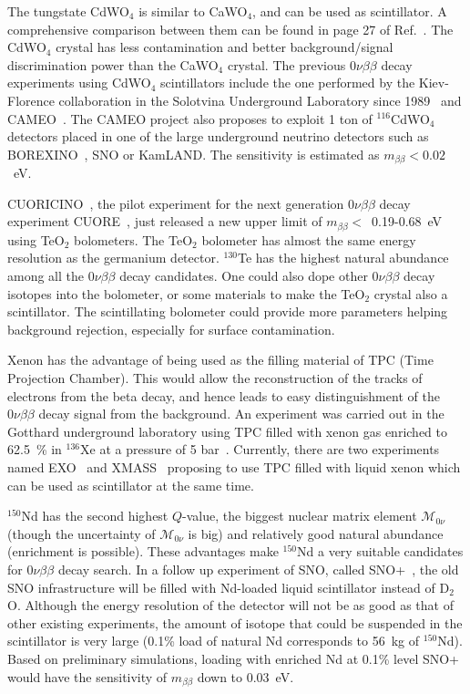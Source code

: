 The tungstate CdWO$_{4}$ is similar to CaWO$_{4}$, and can be used as scintillator. A comprehensive comparison between them can be found in page 27 of Ref.~\cite{Avi05}. The CdWO$_{4}$ crystal has less contamination and better background/signal discrimination power than the CaWO$_{4}$ crystal. The previous $0\nu\beta\beta$ decay experiments using CdWO$_{4}$ scintillators include the one performed by the Kiev-Florence collaboration in the Solotvina Underground Laboratory since 1989~\cite{Dan00, Dan03} and CAMEO~\cite{Bel00, Bel01}. The CAMEO project also proposes to exploit 1 ton of $^{116}$CdWO$_{4}$ detectors placed in one of the large underground neutrino detectors such as BOREXINO~\cite{Arp08}, SNO or KamLAND. The sensitivity is estimated as $m_{\beta\beta} < 0.02$~eV.

CUORICINO~\cite{Pre04}, the pilot experiment for the next generation $0\nu\beta\beta$ decay experiment CUORE~\cite{Arn04, Ard05}, just released a new upper limit of $m_{\beta\beta} <$~0.19-0.68~eV~\cite{Arn08} using TeO$_{2}$ bolometers. The TeO$_{2}$ bolometer has almost the same energy resolution as the germanium detector. $^{130}$Te has the highest natural abundance among all the $0\nu\beta\beta$ decay candidates. One could also dope other $0\nu\beta\beta$ decay isotopes into the bolometer, or some materials to make the TeO$_{2}$ crystal also a scintillator. The scintillating bolometer could provide more parameters helping background rejection, especially for surface contamination.

Xenon has the advantage of being used as the filling material of TPC (Time Projection Chamber). This would allow the reconstruction of the tracks of electrons from the beta decay, and hence leads to easy distinguishment of the $0\nu\beta\beta$ decay signal from the background. An experiment was carried out in the Gotthard underground laboratory using TPC filled with xenon gas enriched to 62.5~\% in $^{136}$Xe at a pressure of 5 bar~\cite{Lue98}. Currently, there are two experiments named EXO~\cite{Aki05} and XMASS~\cite{Kim05} proposing to use TPC filled with liquid xenon which can be used as scintillator at the same time.

$^{150}$Nd has the second highest $Q$-value, the biggest nuclear matrix element $\mathcal{M}_{0\nu}$ (though the uncertainty of $\mathcal{M}_{0\nu}$ is big) and relatively good natural abundance (enrichment is possible). These advantages make $^{150}$Nd a very suitable candidates for $0\nu\beta\beta$ decay search. In a follow up experiment of SNO, called SNO+~\cite{Zub07}, the old SNO infrastructure will be filled with Nd-loaded liquid scintillator instead of D$_{2}$O. Although the energy resolution of the detector will not be as good as that of other existing experiments, the amount of isotope that could be suspended in the scintillator is very large (0.1\% load of natural Nd corresponds to 56~kg of $^{150}$Nd). Based on preliminary simulations, loading with enriched Nd at 0.1\% level SNO+ would have the sensitivity of $m_{\beta\beta}$ down to 0.03~eV.

